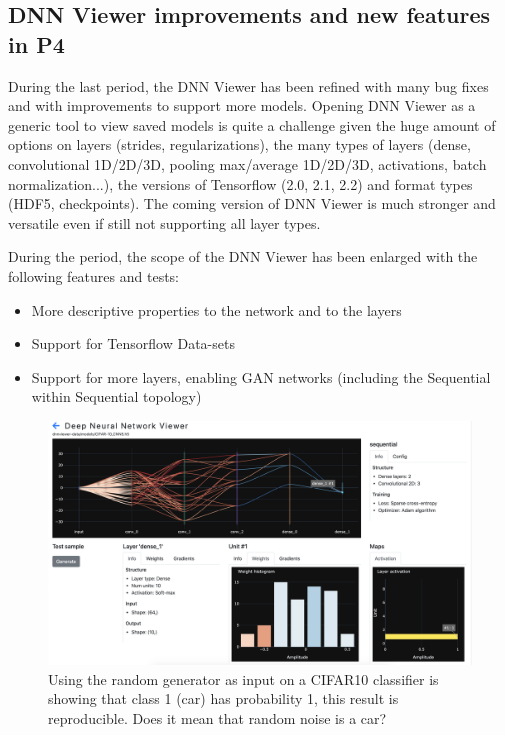 \subsection{DNN Viewer improvements and new features in P4}

During the last period, the DNN Viewer has been refined with many bug fixes and with improvements to support more models. Opening DNN Viewer as a generic tool to view saved models is quite a challenge given the huge amount of options on layers (strides, regularizations), the many types of layers (dense, convolutional 1D/2D/3D, pooling max/average 1D/2D/3D, activations, batch normalization...), the versions of Tensorflow (2.0, 2.1, 2.2) and format types (HDF5, checkpoints). The coming version of DNN Viewer is much stronger and versatile even if still not supporting all layer types.

During the period, the scope of the DNN Viewer has been enlarged with the following features and tests:
\begin{itemize}
    \item More descriptive properties to the network and to the layers
    \item Support for Tensorflow Data-sets
    \item Support for more layers, enabling GAN networks (including the Sequential within Sequential topology)
\end{itemize}


\begin{figure}[H]
    \centering
    \includegraphics[scale=0.3]{images/dnn-viewer/CIFAR10+Random.png}
    \caption{Using the random generator as input on a CIFAR10 classifier is showing that class 1 (car) has probability 1, this result is reproducible. Does it mean that random noise is a car?}
    \label{fig:dnn-viewer-random-generator-cifar10}
\end{figure}

